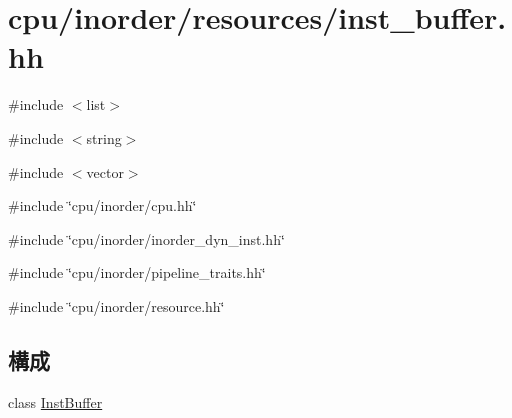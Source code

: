 \hypertarget{inst__buffer_8hh}{
\section{cpu/inorder/resources/inst\_\-buffer.hh}
\label{inst__buffer_8hh}
}
{\ttfamily \#include $<$list$>$}\par
{\ttfamily \#include $<$string$>$}\par
{\ttfamily \#include $<$vector$>$}\par
{\ttfamily \#include \char`\"{}cpu/inorder/cpu.hh\char`\"{}}\par
{\ttfamily \#include \char`\"{}cpu/inorder/inorder\_\-dyn\_\-inst.hh\char`\"{}}\par
{\ttfamily \#include \char`\"{}cpu/inorder/pipeline\_\-traits.hh\char`\"{}}\par
{\ttfamily \#include \char`\"{}cpu/inorder/resource.hh\char`\"{}}\par
\subsection*{構成}
\begin{DoxyCompactItemize}
\item 
class \hyperlink{classInstBuffer}{InstBuffer}
\end{DoxyCompactItemize}
